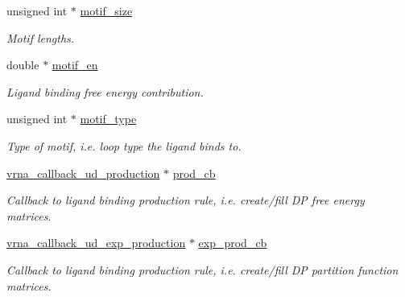 \begin{DoxyCompactItemize}
unsigned int $\ast$ \hyperlink{group__domains__up_a6a9f89ab7d147eb0ffd6cf8d77d178c0}{motif\+\_\+size}
\begin{DoxyCompactList}\small\item\em Motif lengths. \end{DoxyCompactList}\item 
\mbox{\label{group__domains__up_aae4f0a45419784fb7c244bce2781403d}} 
double $\ast$ \hyperlink{group__domains__up_aae4f0a45419784fb7c244bce2781403d}{motif\+\_\+en}
\begin{DoxyCompactList}\small\item\em Ligand binding free energy contribution. \end{DoxyCompactList}\item 
\mbox{\label{group__domains__up_a3f0c026cced369ff176a66b2820f2057}} 
unsigned int $\ast$ \hyperlink{group__domains__up_a3f0c026cced369ff176a66b2820f2057}{motif\+\_\+type}
\begin{DoxyCompactList}\small\item\em Type of motif, i.\+e. loop type the ligand binds to. \end{DoxyCompactList}\item 
\hyperlink{group__domains__up_ga4fdfc02c1b660c07f2d887772f02a0a1}{vrna\+\_\+callback\+\_\+ud\+\_\+production} $\ast$ \hyperlink{group__domains__up_ac2656d57130ac56e85212836482cbe80}{prod\+\_\+cb}
\begin{DoxyCompactList}\small\item\em Callback to ligand binding production rule, i.\+e. create/fill DP free energy matrices. \end{DoxyCompactList}\item 
\mbox{\label{group__domains__up_a181ae6ec67f77e68899ec6a0780f3e01}} 
\hyperlink{group__domains__up_ga33d78327dcd04c1ca5ab2887edc18c7b}{vrna\+\_\+callback\+\_\+ud\+\_\+exp\+\_\+production} $\ast$ \hyperlink{group__domains__up_a181ae6ec67f77e68899ec6a0780f3e01}{exp\+\_\+prod\+\_\+cb}
\begin{DoxyCompactList}\small\item\em Callback to ligand binding production rule, i.\+e. create/fill DP partition function matrices. \end{DoxyCompactList}\item 
\mbox{\label{group__domains__up_a1efba765dd4ea893dc8bd7362761f99b}} 

\end{DoxyCompactItemize}
